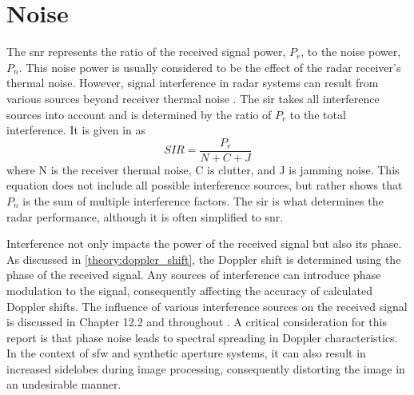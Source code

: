 \documentclass[class=report,11pt,crop=false]{standalone}
\begin{document}
            
\section{Noise} \label{theory:noise}
The \gls{snr} represents the ratio of the received signal power, $P_r$, to the noise power, $P_n$. This noise power is usually considered to be the effect of the radar receiver's thermal noise. %
However, signal interference in radar systems can result from various sources beyond receiver thermal noise \cite{pomr}. The \gls{sir} takes all interference sources into account and is determined by the ratio of $P_r$ to the total interference. It is given in \cite{pomr} as
\begin{equation}\label{eq:sir}
    SIR = \frac{P_r}{N + C + J}
\end{equation}
where N is the receiver thermal noise, C is clutter, and J is jamming noise. This equation does not include all possible interference sources, but rather shows that $P_n$ is the sum of multiple interference factors. The \gls{sir} is what determines the radar performance, although it is often simplified to \gls{snr}.

Interference not only impacts the power of the received signal but also its phase. As discussed in \autoref{theory:doppler_shift}, the Doppler shift is determined using the phase of the received signal. Any sources of interference can introduce phase modulation to the signal, consequently affecting the accuracy of calculated Doppler shifts. The influence of various interference sources on the received signal is discussed in Chapter 12.2 and throughout \cite{pomr}. 
A critical consideration for this report is that phase noise leads to spectral spreading in Doppler characteristics. In the context of \gls{sfw} and synthetic aperture systems, it can also result in increased sidelobes during image processing, consequently distorting the image in an undesirable manner.%
\end{document}

